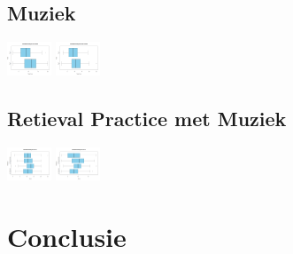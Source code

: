 \documentclass{hogent-article}
\begin{document}
	\subsection{Muziek}
	\includegraphics[width=50px]{Rplot_MetMuziek}	
	\includegraphics[width=50px]{Rplot_ZonderMuziek}
		
	
	\subsection{Retieval Practice met Muziek}
	\includegraphics[width=50px]{Rplot_RetrievalPracticeMuziek_Score1}	
	\includegraphics[width=50px]{Rplot_RetrievalPracticeMuziek_Score2}
	
	
	
	\section{Conclusie}
	
	
	
	
	\printbibliography[heading=bibintoc]
	
\end{document}
